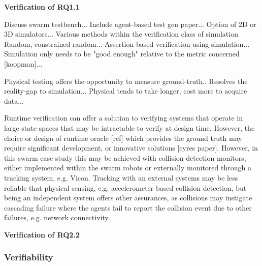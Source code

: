 \documentclass[lettersize,journal]{IEEEtran}
\begin{document}
\noindent\textbf{Verification of RQ1.1}

Discuss swarm testbench...
Include agent-based test gen paper...
Option of 2D or 3D simulators...
Various methods within the verification class of simulation
Random, constrained random...
Assertion-based verification using simulation...
Simulation only needs to be "good enough" relative to the metric concerned [koopman]...

Physical testing offers the opportunity to measure ground-truth..
Resolves the reality-gap to simulation...
Physical tends to take longer, cost more to acquire data...

Runtime verification can offer a solution to verifying systems that operate in large state-spaces that may be intractable to verify at design time. However, the choice or design of runtime oracle [ref] which provides the ground truth may require significant development, or innovative solutions [cyres paper]. However, in this swarm case study this may be achieved with collision detection monitors, either implemented within the swarm robots or externally monitored through a tracking system, e.g. Vicon. Tracking with an external systems may be less reliable that physical sensing, e.g. accelerometer based collision detection, but being an independent system offers other assurances, as collisions may instigate cascading failure where the agents fail to report the collision event due to other failures, e.g. network connectivity.


\noindent\textbf{Verification of RQ2.2}





\subsubsection{Verifiability}
\end{document}
